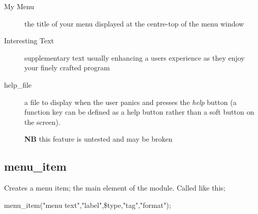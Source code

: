 \documentclass[a4paper]{scrartcl}
\begin{document}
\begin{description}
\item [My Menu] the title of your menu displayed at the centre-top of the menu window
\item [Interesting Text] supplementary text usually enhancing a users experience as they enjoy your finely crafted program
\item [help\_file] a file to display when the user panics and presses the \textit{help} button (a function key can be defined as a help button rather than a soft button on the screen).

\textbf{NB} this feature is untested and may be broken
\end{description}

\subsection{menu\_item}
Creates a menu item; the main element of the module. Called like this;
\begin{center}
menu\_item("menu text","label",\$type,"tag","format");
\end{center}
\end{document}
